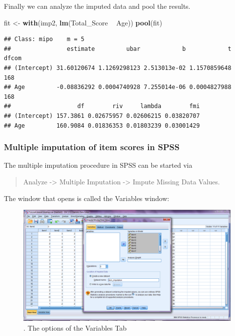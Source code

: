 \documentclass[]{book}
\newenvironment{Shaded}{\begin{snugshade}}{\end{snugshade}}
\newcommand{\KeywordTok}[1]{\textcolor[rgb]{0.13,0.29,0.53}{\textbf{#1}}}
\newcommand{\StringTok}[1]{\textcolor[rgb]{0.31,0.60,0.02}{#1}}
\newcommand{\OperatorTok}[1]{\textcolor[rgb]{0.81,0.36,0.00}{\textbf{#1}}}
\newcommand{\NormalTok}[1]{#1}
\begin{document}
Finally we can analyze the imputed data and pool the results.

\begin{Shaded}
\begin{Highlighting}[]
\NormalTok{fit <-}\StringTok{ }\KeywordTok{with}\NormalTok{(imp2, }\KeywordTok{lm}\NormalTok{(Total_Score }\OperatorTok{~}\StringTok{ }\NormalTok{Age))}
\KeywordTok{pool}\NormalTok{(fit)}
\end{Highlighting}
\end{Shaded}

\begin{verbatim}
## Class: mipo    m = 5 
##                estimate         ubar            b            t dfcom
## (Intercept) 31.60120674 1.1269298123 2.513013e-02 1.1570859648   168
## Age         -0.08836292 0.0004740928 7.255014e-06 0.0004827988   168
##                   df        riv     lambda        fmi
## (Intercept) 157.3861 0.02675957 0.02606215 0.03820707
## Age         160.9084 0.01836353 0.01803239 0.03001429
\end{verbatim}

\subsubsection{Multiple imputation of item scores in
SPSS}\label{multiple-imputation-of-item-scores-in-spss}

The multiple imputation procedure in SPSS can be started via

\begin{quote}
Analyze -\textgreater{} Multiple Imputation -\textgreater{} Impute
Missing Data Values.
\end{quote}

The window that opens is called the Variables window:

\begin{figure}

{\centering \includegraphics[width=0.9\linewidth]{images/fig8.1} 

}

\caption{. The options of the Variables Tab}\label{fig:fig8-1}
\end{figure}
\end{document}
